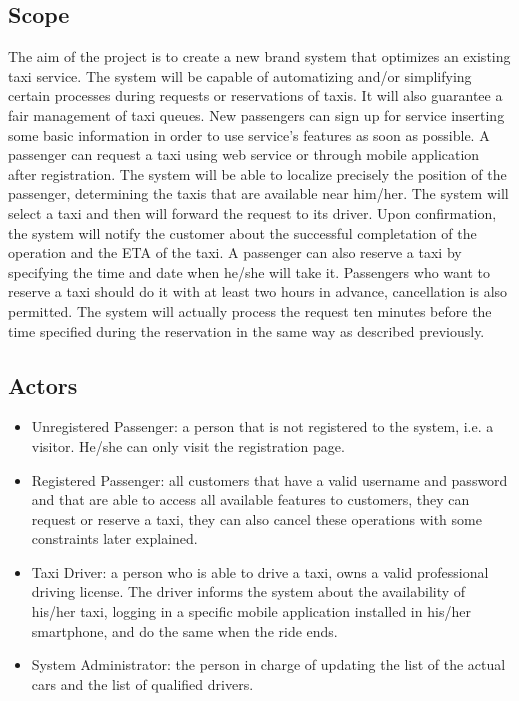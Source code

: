 \documentclass[a4paper,12pt]{article}%
\begin{document}
\subsection{Scope}
The aim of the project is to create a new brand system that optimizes an 
existing taxi service.
The system will be capable of automatizing  and/or simplifying certain 
processes during requests or reservations of taxis.
It will also guarantee a fair management of taxi queues.
New passengers can sign up for service inserting some basic information in order to use service's features as soon as possible.
A passenger can request a taxi using web service or through mobile
application after registration. The system will be able to localize precisely the position
of the passenger, determining the taxis that are available near
him/her. The system will select a taxi and then will forward the request to its driver.
Upon confirmation, the system will notify the customer about the successful completation of the operation and the ETA of the taxi. A passenger can also reserve a taxi by specifying the time and date when he/she will take it.
Passengers who want to reserve a taxi should do it with at least two hours in advance, cancellation is also permitted. The system will actually process the request ten minutes before the time specified during the reservation in the same way as described previously.

\subsection{Actors}
\begin{itemize}
\item Unregistered Passenger: a person that is not registered to the system, i.e. a visitor. He/she can only visit the registration page.
\item Registered Passenger: all customers that have a valid username and password and that are able to access all available features to customers, they can request or reserve a taxi, they can also cancel these operations with some constraints later explained.
\item Taxi Driver: a person who is able to drive a taxi, owns a valid 
professional driving license. The driver informs the system about the availability of his/her taxi, logging in a specific mobile application installed in his/her smartphone, and do the same when the ride ends. 
\item System Administrator: the person in charge of updating the list of the actual cars and the list of qualified drivers.
\end{itemize}
\end{document}
